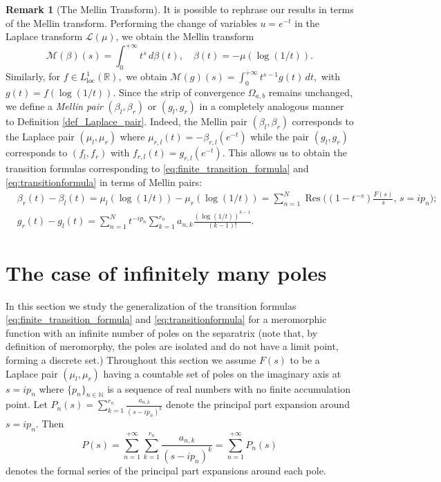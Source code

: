 \documentclass[12pt]{article}
\theoremstyle{definition}
\newtheorem{remark}[theorem]{Remark}
\DeclareMathOperator*{\Res}{Res}
\begin{document}
\begin{remark}[The Mellin Transform] It is possible to rephrase our results in terms of the Mellin transform. 
Performing the change of variables $u=e^{-t}$ in the Laplace transform $\mathcal{L}(\mu)$, we obtain the Mellin transform
\[ \mathcal{M}(\beta)(s)= \int_{0}^{+ \infty} t^s \,d\beta(t), \quad \beta(t)=-\mu(\log(1/t)).\] 
Similarly, for $f \in L^1_{\text{loc}}(\mathbb{R}),$ we obtain $\displaystyle{\mathcal{M}(g)(s)=\int_{0}^{+ \infty}t^{s-1}g(t) \,dt},$ with $g(t)=f(\log(1/t)).$ Since the strip of convergence $\Omega_{a,b}$ remains unchanged, we define a \emph{Mellin pair} $(\beta_l, \beta_r)$ or $(g_l, g_r)$ in a completely analogous manner to Definition \ref{def_Laplace_pair}. Indeed, the Mellin pair $(\beta_l, \beta_r)$ corresponds to the Laplace pair $(\mu_l, \mu_r)$ where $\mu_{r,l}(t)=-\beta_{r,l}(e^{-t})$ while the pair $(g_l, g_r)$ corresponds to $(f_l, f_r)$ with $f_{r,l}(t)=g_{r,l}(e^{-t}).$ This allows us to obtain the transition formulas corresponding to \eqref{eq:finite_transition_formula} and \eqref{eq:transitionformula} in terms of Mellin pairs:
\begin{align*}
    &\beta_r(t)-\beta_l(t)=\mu_l(\log(1/t))-\mu_r(\log(1/t))= \sum_{n=1}^{N}\Res \bigg( (1-t^{-s})\frac{F(s)}{s}, \, s=ip_n \bigg ); \\
&g_r(t)-g_l(t)= \sum_{n=1}^{N}t^{-ip_n}\sum_{k=1}^{r_n}a_{n,k}\frac{(\log(1/t))^{k-1}}{(k-1)!}.
\end{align*} 
\end{remark}


\section{The case of infinitely many poles}
\label{sec_infinite_poles}

In this section we study the generalization of the transition formulas \eqref{eq:finite_transition_formula} and \eqref{eq:transitionformula} for a meromorphic function with an infinite number of poles on the separatrix  (note that, by definition of meromorphy, the poles are isolated and do not have a limit point, forming a discrete set.) Throughout this section we assume $F(s)$ to be a Laplace pair $(\mu_l, \mu_r)$ having a countable set of poles on the imaginary axis at $s=ip_n$ where $\{p_n\}_{n \in \mathbb{N}}$ is a sequence of real numbers with no finite accumulation point.  Let $P_n(s)= \sum_{k=1}^{r_n}\frac{
a_{n,k}}{(s-ip_n)^k}$ denote the principal part expansion around $s=ip_n.$ Then \[P(s)= \sum_{n=1}^{+ \infty}\sum_{k=1}^{r_n}\frac{a_{n,k}}{(s-ip_n)^k}= \sum_{n=1}^{+ \infty}P_n(s) \] denotes the formal series of the principal part expansions around each pole.
\end{document}

